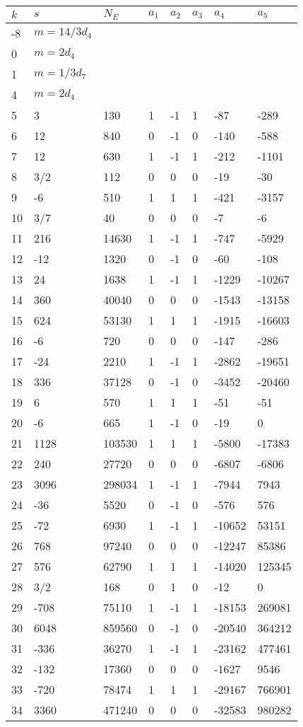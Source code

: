 \documentclass{amsart}
\begin{document}
\begin{longtable}{|l|l|l|lllll|}
\hline
$k$ & $s$ & $N_E$ & $a_1$ & $a_2$ & $a_3$ & $a_4$ & $a_5$\\
\hline
-8&$m=14/3d_{4}$&&\multicolumn{5}{c|}{}\\
0&$m=2d_{4}$&&\multicolumn{5}{c|}{}\\
1&$m=1/3d_{7}$&&\multicolumn{5}{c|}{}\\
4&$m=2d_{4}$&&\multicolumn{5}{c|}{}\\
5&3&130&1&-1&1&-87&-289\\
6&12&840&0&-1&0&-140&-588\\
7&12&630&1&-1&1&-212&-1101\\
8&3/2&112&0&0&0&-19&-30\\
9&-6&510&1&1&1&-421&-3157\\
10&3/7&40&0&0&0&-7&-6\\
11&216&14630&1&-1&1&-747&-5929\\
12&-12&1320&0&-1&0&-60&-108\\
13&24&1638&1&-1&1&-1229&-10267\\
14&360&40040&0&0&0&-1543&-13158\\
15&624&53130&1&1&1&-1915&-16603\\
16&-6&720&0&0&0&-147&-286\\
17&-24&2210&1&-1&1&-2862&-19651\\
18&336&37128&0&-1&0&-3452&-20460\\
19&6&570&1&1&1&-51&-51\\
20&-6&665&1&-1&0&-19&0\\
21&1128&103530&1&1&1&-5800&-17383\\
22&240&27720&0&0&0&-6807&-6806\\
23&3096&298034&1&-1&1&-7944&7943\\
24&-36&5520&0&-1&0&-576&576\\
25&-72&6930&1&-1&1&-10652&53151\\
26&768&97240&0&0&0&-12247&85386\\
27&576&62790&1&1&1&-14020&125345\\
28&3/2&168&0&1&0&-12&0\\
29&-708&75110&1&-1&1&-18153&269081\\
30&6048&859560&0&-1&0&-20540&364212\\
31&-336&36270&1&-1&1&-23162&477461\\
32&-132&17360&0&0&0&-1627&9546\\
33&-720&78474&1&1&1&-29167&766901\\
34&3360&471240&0&0&0&-32583&980282\\

\end{longtable}
\end{document}
